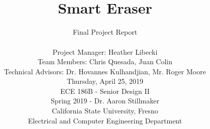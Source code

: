 \begin{filecontents*}{reference.bib}
}
	@misc{socket,
	author			={Nathan Jennings},
	title			={{Socket Programming in Python (Guide)}},
	note			={\url{https://realpython.com/python-sockets/#multi-connection-client}
	}
	
}
\end{filecontents*}

\documentclass[12pt,onecolumn]{IEEEtran}			
\usepackage{dtk-logos}						
\usepackage{graphics}
\usepackage{float}
\usepackage{caption} 
\usepackage[export]{adjustbox}
\usepackage{hyperref}
\usepackage{placeins}
\usepackage{listings}
\usepackage{color}
\usepackage{xcolor}
\usepackage{rotating}


\hypersetup{
	colorlinks=true,
	linkcolor=black,
	filecolor=black,      
	urlcolor=black,
	citecolor=black,
}

\title{ \hfill  \vspace{2in} \\ Smart Eraser \vspace{0.05in} }	

\author{Final Project Report \\ \vspace{0.6in}
\vspace{12pt} 

Project Manager: Heather Libecki\\
\vspace{5pt}
Team Members: Chris Quesada, Juan Colin \\
\vspace{5pt}
Technical Advisors: Dr. Hovannes Kulhandjian, Mr. Roger Moore	\\			
\vspace{12pt} 								
Thursday, April 25, 2019 \\ 
\vspace{3.2in}
ECE 186B - Senior Design II \\ 					
Spring 2019 - Dr. Aaron Stillmaker \\
\vspace{5pt}
California State University, Fresno \\
Electrical and Computer Engineering Department \\ 

\vspace{2in}							


\vspace{4in}}							
										




